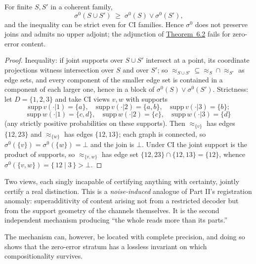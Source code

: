 
\begin{thmplain}

For finite \(S, S'\) in a coherent family,
\[
\sigma^{0}(S \cup S') \;\ge\; \sigma^{0}(S) \vee \sigma^{0}(S'),
\]
and the inequality can be strict even for CI families. Hence \(\sigma^0\) does not preserve joins and admits no upper adjoint; the adjunction of \hyperlink{stmt:6.2}{Theorem~6.2} fails for zero-error content.
\end{thmplain}

\begin{proof}

Inequality: if joint supports over \(S \cup S'\) intersect at a point, its coordinate projections witness intersection over \(S\) and over \(S'\); so \(\approx_{S\cup S'} \subseteq \approx_S \cap \approx_{S'}\) as edge sets, and every component of the smaller edge set is contained in a component of each larger one, hence in a block of \(\sigma^0(S) \vee \sigma^0(S')\). Strictness: let \(D = \{1,2,3\}\) and take CI views \(v, w\) with supports
\[
\mathrm{supp}\,v(\cdot|1)=\{a\},\quad \mathrm{supp}\,v(\cdot|2)=\{a,b\},\quad \mathrm{supp}\,v(\cdot|3)=\{b\};
\]
\[
\mathrm{supp}\,w(\cdot|1)=\{c,d\},\quad \mathrm{supp}\,w(\cdot|2)=\{c\},\quad \mathrm{supp}\,w(\cdot|3)=\{d\}
\]
(any strictly positive probabilities on these supports). Then \(\approx_{\{v\}}\) has edges \(\{12, 23\}\) and \(\approx_{\{w\}}\) has edges \(\{12, 13\}\); each graph is connected, so \(\sigma^0(\{v\}) = \sigma^0(\{w\}) = \bot\) and the join is \(\bot\). Under CI the joint support is the product of supports, so \(\approx_{\{v,w\}}\) has edge set \(\{12,23\} \cap \{12,13\} = \{12\}\), whence \(\sigma^0(\{v,w\}) = \{\,12 \mid 3\,\} > \bot\).
\end{proof}

Two views, each singly incapable of certifying anything with certainty, jointly certify a real distinction. This is a \emph{noise-induced} analogue of Part II's registration anomaly: superadditivity of content arising not from a restricted decoder but from the support geometry of the channels themselves. It is the second independent mechanism producing ``the whole reads more than its parts.''

The mechanism can, however, be located with complete precision, and doing so shows that the zero-error stratum has a lossless invariant on which compositionality survives.

